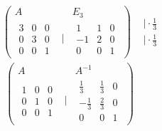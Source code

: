 \documentclass[12pt,a4paper]{article}
\begin{document}
\[
\begin{matrix}
    \begin{pmatrix}
        A && E_3\\
        \begin{matrix}
            3 & 0 & 0 \\
            0 & 3 & 0 \\
            0 & 0 & 1
        \end{matrix} & \vert &
        \begin{matrix}
            1 & 1 & 0 \\
            -1 & 2 & 0 \\
            0 & 0 & 1
        \end{matrix}
    \end{pmatrix}
    &
    \begin{matrix}
        \vert \cdot \frac{1}{3} \\
        \vert \cdot \frac{1}{3}
    \end{matrix}
    &&
\end{matrix}
\]
\[
\begin{matrix}
    \begin{pmatrix}
        A && A^{-1}\\
        \begin{matrix}
            1 & 0 & 0 \\
            0 & 1 & 0 \\
            0 & 0 & 1
        \end{matrix} & \vert &
        \begin{matrix}
            \frac{1}{3} & \frac{1}{3} & 0 \\
            -\frac{1}{3} & \frac{2}{3} & 0 \\
            0 & 0 & 1
        \end{matrix}
    \end{pmatrix}
    &&&&&
\end{matrix}
\]
\end{document}
